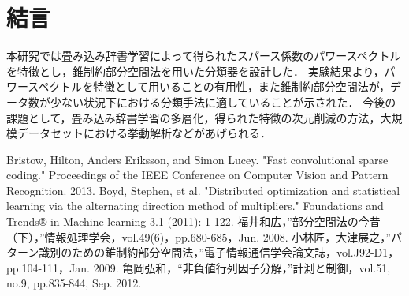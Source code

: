 \documentclass[9pt,a4paper,twocolumn,uplatex]{jsarticle}
\begin{document}
\section{結言}
本研究では畳み込み辞書学習によって得られたスパース係数のパワースペクトルを特徴とし，錐制約部分空間法を用いた分類器を設計した．
実験結果より，パワースペクトルを特徴として用いることの有用性，また錐制約部分空間法が，データ数が少ない状況下における分類手法に適していることが示された．
今後の課題として，畳み込み辞書学習の多層化，得られた特徴の次元削減の方法，大規模データセットにおける挙動解析などがあげられる．
\begin{small}
\begin{thebibliography}{}
	 Bristow, Hilton, Anders Eriksson, and Simon Lucey. "Fast convolutional sparse coding." Proceedings of the IEEE Conference on Computer Vision and Pattern Recognition. 2013.
	 Boyd, Stephen, et al. "Distributed optimization and statistical learning via the alternating direction method of multipliers." Foundations and Trends® in Machine learning 3.1 (2011): 1-122.
	 福井和広，”部分空間法の今昔（下），”情報処理学会，vol.49(6)，pp.680-685，Jun. 2008.
	 小林匠，大津展之，”パターン識別のための錐制約部分空間法，”電子情報通信学会論文誌，vol.J92-D1，pp.104-111，Jan. 2009.
	 亀岡弘和，“非負値行列因子分解，”計測と制御，vol.51, no.9, pp.835-844, Sep. 2012.
\end{thebibliography}
\end{small}
\end{document}
